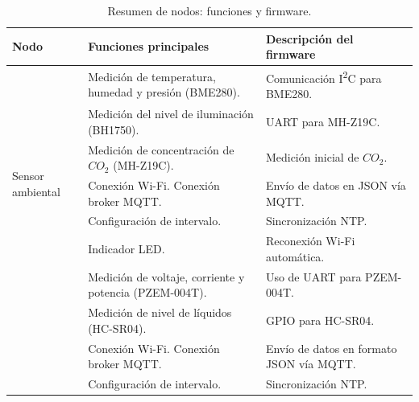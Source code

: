 \begin{table}[H]
    \centering
    \caption[Resumen de nodos]{Resumen de nodos: funciones y firmware.}
    \begin{tabular}{p{1.5cm}p{5.4cm}p{5.5cm}}
        \toprule
        \textbf{Nodo}                                     & \textbf{Funciones principales}                                  & \textbf{Descripción del firmware}               \\
        \midrule
        \multirow{7}{1.5cm}{Sensor ambiental}             & Medición de temperatura, humedad y presión (BME280).            & Comunicación I\textsuperscript{2}C para BME280. \\
                                                          & Medición del nivel de iluminación (BH1750).                     & UART para MH-Z19C.                              \\
                                                          & Medición de concentración de $CO_2$ (MH-Z19C).                  & Medición inicial de $CO_2$.                     \\
                                                          & Conexión Wi-Fi.                     Conexión broker MQTT.       & Envío de datos en JSON vía MQTT.                \\
                                                          & Configuración de intervalo.                                     & Sincronización NTP.                             \\
                                                          & Indicador LED.                                                  & Reconexión Wi-Fi automática.                    \\
        \midrule
        \multirow{6}{1.5cm}{Sensor de consumos}           & Medición de voltaje, corriente y potencia (PZEM-004T).          & Uso de UART para PZEM-004T.                     \\
                                                          & Medición de nivel de líquidos (HC-SR04).                        & GPIO para HC-SR04.                              \\
                                                          & Conexión Wi-Fi.                     Conexión broker MQTT.       & Envío de datos en formato JSON vía MQTT.        \\
                                                          & Configuración de intervalo.                                     & Sincronización NTP.                             \\

\end{tabular}
\end{table}
